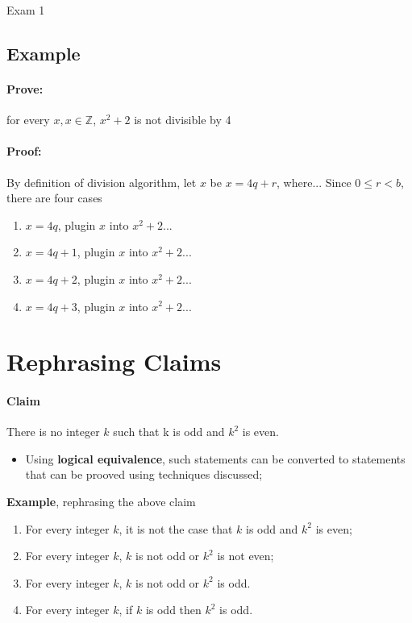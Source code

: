 \documentclass{note}
\begin{document}
\begin{note}{Exam 1}
        \subsection{Example}

        \paragraph{Prove:} for every $ x, x \in \mathbb{Z} $, $ x^{2} + 2 $ is not divisible by 4

        \paragraph{Proof:} By definition of division algorithm, let $ x $ be $ x = 4q + r $, where...
        Since $ 0 \leq r < b $, there are four cases
        \begin{enumerate}
            \item $ x = 4q $, plugin $ x $ into $ x^{2} + 2 $...
            \item $ x = 4q + 1 $, plugin $ x $ into $ x^{2} + 2 $...
            \item $ x = 4q + 2 $, plugin $ x $ into $ x^{2} + 2 $...
            \item $ x = 4q + 3 $, plugin $ x $ into $ x^{2} + 2 $...
        \end{enumerate}

        \section{Rephrasing Claims}

        \paragraph{Claim} There is no integer $ k $ such that k is odd and $ k^{2} $ is even.
        \begin{itemize}
            \item Using \textbf{logical equivalence}, such statements can be converted to statements
            that can be prooved using techniques discussed;
        \end{itemize}

        \textbf{Example}, rephrasing the above claim

        \begin{enumerate}
            \item For every integer $ k $, it is not the case that $ k $ is odd and $ k^{2} $ is even;
            \item For every integer $ k $, $ k $ is not odd or $ k^{2} $ is not even;
            \item For every integer $ k $, $ k $ is not odd or $ k^{2} $ is odd.
            \item For every integer $ k $, if $ k $ is odd then $ k^{2} $ is odd.
        \end{enumerate}


\end{note}
\end{document}
